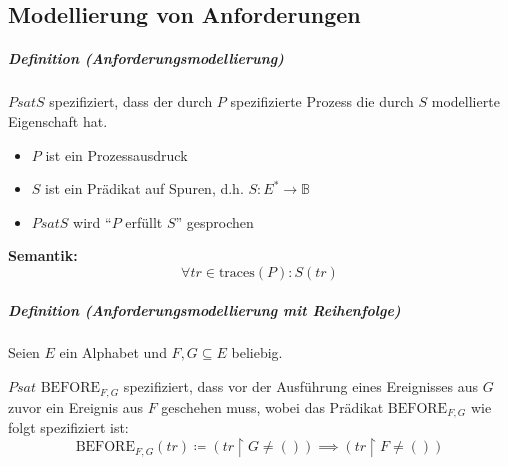 \documentclass[a4paper, 11pt, accentcolor = tud3b]{tudreport}
\newcommand{\subsubparagraph}[1]{\hspace{1cm} \textbf{#1:}}
\newcommand{\definition}[2]{\subparagraph{Definition (#1)} #2}
\begin{document}
		    \subsection{Modellierung von Anforderungen}
			    \label{sec:anfmod}
		    
			    \definition{Anforderungsmodellierung}{
			    	$ P \textit{sat} S $ spezifiziert, dass der durch $ P $ spezifizierte Prozess die durch $ S $ modellierte Eigenschaft hat.
			    	\begin{itemize}
			    		\item $ P $ ist ein Prozessausdruck
			    		\item $ S $ ist ein Prädikat auf Spuren, d.h. $ S : E ^ * \rightarrow \mathbb{B} $
			    		\item $ P \textit{sat} S $ wird \enquote{$ P $ erfüllt $ S $} gesprochen
			    	\end{itemize}
			    	
			    	\subsubparagraph{Semantik}
				    	\begin{equation*}
					    	\forall \textit{tr} \in \text{traces}(P) : S(\textit{tr})
				    	\end{equation*}
			    }
			    
			    \definition{Anforderungsmodellierung mit Reihenfolge}{
			    	Seien $ E $ ein Alphabet und $ F, G \subseteq E $ beliebig.
			    	
			    	$ P \textit{sat } \text{BEFORE} _ { F, G } $ spezifiziert, dass vor der Ausführung eines Ereignisses aus $ G $ zuvor ein Ereignis aus $ F $ geschehen muss, wobei das Prädikat $ \text{BEFORE} _ { F, G } $ wie folgt spezifiziert ist:
			    	\begin{equation*}
				    	\text{BEFORE} _ { F, G } (\textit{tr}) \coloneqq (\textit{tr} \upharpoonright G \neq ()) \implies (\textit{tr} \upharpoonright F \neq ())
			    	\end{equation*}
			    }
		    
\end{document}
